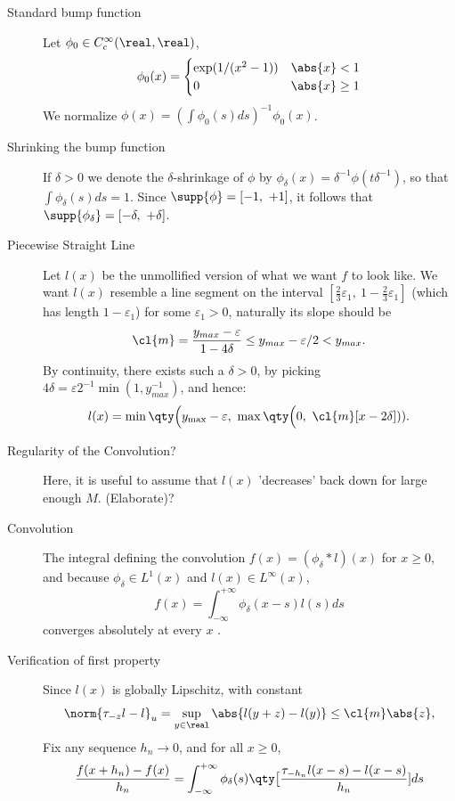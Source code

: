 \documentclass[../main-v2-manifolds.tex]{subfiles}
\begin{document}
\begin{description}
    \item[Standard bump function] Let $\phi_0\in C_c^\infty(\real,\real)$,
        \[
        \phi_0(x) = \begin{cases}
            \exp(1/(x^2-1)) & \abs{x} < 1 \\
            0 & \abs{x}\geq 1
        \end{cases}
    \]
    We normalize $\phi(x) = (\int\phi_0(s)ds)^{-1}\phi_0(x)$. 
    \item[Shrinking the bump function]
    If $\delta>0$ we denote the $\delta$-shrinkage of $\phi$ by $\phi_{\delta}(x) = \delta^{-1}\phi(t\delta^{-1})$, so that $\int \phi_{\delta}(s)ds = 1$. Since $\supp{\phi}=[-1,\ +1]$, it follows that $\supp{\phi_{\delta}} = [-\delta,\ +\delta]$. 
    \item[Piecewise Straight Line]
    Let $l(x)$ be the unmollified version of what we want $f$ to look like. We want $l(x)$ resemble a line segment on the interval $[\frac{2}{3}\varepsilon_1,\ 1-\frac{2}{3}\varepsilon_1]$  (which has length $1-\varepsilon_1$) for some $\varepsilon_1>0$, naturally its slope should be
    \[
        \cl{m} = \dfrac{y_{max} - \varepsilon}{1-4\delta}\leq y_{max} - \varepsilon/2<y_{max}.
    \]
    By continuity, there exists such a $\delta>0$, by picking $4\delta = \varepsilon2^{-1}\min(1,y_{max}^{-1})$, and hence:
    \[
        l(x) = \min\qty\Big(y_{\max} - \varepsilon,\  \max\qty\Big(0,\ \cl{m}[x-2\delta])).
    \]
    \item[Regularity of the Convolution?]
    Here, it is useful to assume that $l(x)$ 'decreases' back down for large enough $M$. (Elaborate)?
    \item[Convolution]
    The integral defining the convolution $f(x) = (\phi_\delta\ast l)(x)$ for $x\geq 0$, and because $\phi_\delta\in L^1(x)$ and $l(x)\in L^\infty(x)$,
    \[
        f(x) = \int_{-\infty}^{+\infty}\phi_{\delta}(x-s)l(s)ds
    \]
    converges absolutely at every $x$ \cite[Thms.~~8.7, 8.10]{Folland2013Real}.
    \item[Verification of first property]
    Since $l(x)$ is globally Lipschitz, with constant
    \[
    \norm{\tau_{-z}l - l}_u=\sup_{y\in\real}\abs{l(y+z) - l(y)}\leq \cl{m}\abs{z},
    \]
    Fix any sequence $h_n\to 0$, and for all $x\geq 0$, 
    \begin{align*}
        \dfrac{f(x+h_n) - f(x)}{h_n} &= \int_{-\infty}^{+\infty}\phi_\delta(s)\qty\big[\dfrac{\tau_{-h_n}l(x-s) - l(x-s)}{h_n}]ds\\

\end{align*}
\end{description}
\end{document}

